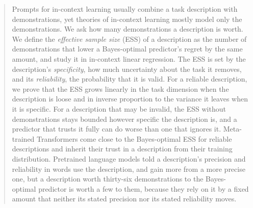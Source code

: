 \documentclass{article}
\begin{document}
\printAffiliationsAndNotice{}

\begin{abstract}
Prompts for in-context learning usually combine a task description with demonstrations, yet theories of in-context learning mostly model only the demonstrations. We ask how many demonstrations a description is worth. We define the \emph{effective sample size} (ESS) of a description as the number of demonstrations that lower a Bayes-optimal predictor's regret by the same amount, and study it in in-context linear regression. The ESS is set by the description's \emph{specificity}, how much uncertainty about the task it removes, and its \emph{reliability}, the probability that it is valid. For a reliable description, we prove that the ESS grows linearly in the task dimension when the description is loose and in inverse proportion to the variance it leaves when it is specific. For a description that may be invalid, the ESS without demonstrations stays bounded however specific the description is, and a predictor that trusts it fully can do worse than one that ignores it. Meta-trained Transformers come close to the Bayes-optimal ESS for reliable descriptions and inherit their trust in a description from their training distribution. Pretrained language models told a description's precision and reliability in words use the description, and gain more from a more precise one, but a description worth thirty-six demonstrations to the Bayes-optimal predictor is worth a few to them, because they rely on it by a fixed amount that neither its stated precision nor its stated reliability moves.
\end{abstract}
\end{document}
